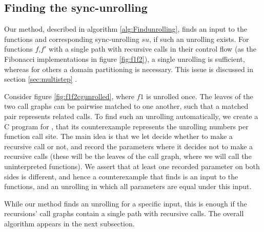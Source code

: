 \subsection{Finding the sync-unrolling}
Our method, described in algorithm \ref{alg:Findunrolling}, finds an input to the functions and corresponding sync-unrolling $su$, if such an unrolling exists. 
For functions $f$,$f'$ with a single path with recursive calls in their control flow (as the Fibonacci implementations in figure \ref{fig:f1f2}), a single unrolling is sufficient, whereas for others a domain partitioning is necessary. This issue is discussed in section \ref{sec:multistep} . 

Consider figure \ref{fig:f1f2cgunrolled}, where $f1$ is unrolled once. The leaves of the two call graphs can be pairwise matched to one another, such that a matched pair represents related calls. To find such an unrolling automatically, we create a C program for , that its counterexample represents the unrolling numbers per function call site. The main idea is that we let  decide whether to make a recursive call or not, and record the parameters where it decides not to make a recursive calls (these will be the leaves of the call graph, where we will call the uninterpreted functions). We assert that at least one recorded parameter on both sides is different, and hence a counterexample that  finds is an input to the functions, and an unrolling in which all parameters are equal under this input. 


While our method finds an unrolling for a specific input, this is enough if the recursions' call graphs contain a single path with recursive calls.
The overall algorithm appears in the next subsection. 

